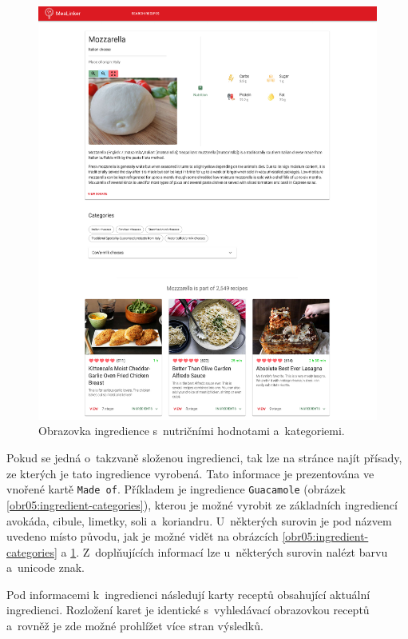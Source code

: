 \begin{figure}[p]\centering
\includegraphics[width=140mm]{../img/ingredient-detail-no-emoji}
\caption{Obrazovka ingredience s~nutričními hodnotami a~kategoriemi.}
\label{obr05:ingredient-detail-no-emoji}
\end{figure}

Pokud se jedná o~takzvaně složenou ingredienci, tak lze na stránce najít přísady, ze kterých je tato ingredience vyrobená. Tato informace je prezentována ve vnořené kartě \texttt{Made\,of}. Příkladem je ingredience \texttt{Guacamole} (obrázek \ref{obr05:ingredient-categories}), kterou je možné vyrobit ze základních ingrediencí avokáda, cibule, limetky, soli a~koriandru. U~některých surovin je pod názvem uvedeno místo původu, jak je možné vidět na obrázcích \ref{obr05:ingredient-categories} a \ref{obr05:ingredient-detail-no-emoji}. Z~doplňujících informací lze u~některých surovin nalézt barvu a~unicode znak.

Pod informacemi k~ingredienci následují karty receptů obsahující aktuální ingredienci. Rozložení karet je identické s~vyhledávací obrazovkou receptů a~rovněž je zde možné prohlížet více stran výsledků. 

